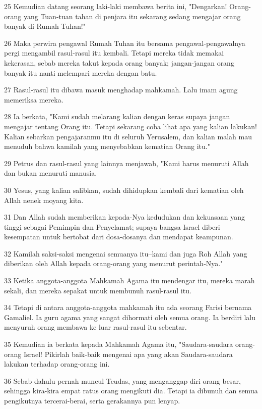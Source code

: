 \par 25 Kemudian datang seorang laki-laki membawa berita ini, "Dengarkan! Orang-orang yang Tuan-tuan tahan di penjara itu sekarang sedang mengajar orang banyak di Rumah Tuhan!"
\par 26 Maka perwira pengawal Rumah Tuhan itu bersama pengawal-pengawalnya pergi mengambil rasul-rasul itu kembali. Tetapi mereka tidak memakai kekerasan, sebab mereka takut kepada orang banyak; jangan-jangan orang banyak itu nanti melempari mereka dengan batu.
\par 27 Rasul-rasul itu dibawa masuk menghadap mahkamah. Lalu imam agung memeriksa mereka.
\par 28 Ia berkata, "Kami sudah melarang kalian dengan keras supaya jangan mengajar tentang Orang itu. Tetapi sekarang coba lihat apa yang kalian lakukan! Kalian sebarkan pengajaranmu itu di seluruh Yerusalem, dan kalian malah mau menuduh bahwa kamilah yang menyebabkan kematian Orang itu."
\par 29 Petrus dan rasul-rasul yang lainnya menjawab, "Kami harus menuruti Allah dan bukan menuruti manusia.
\par 30 Yesus, yang kalian salibkan, sudah dihidupkan kembali dari kematian oleh Allah nenek moyang kita.
\par 31 Dan Allah sudah memberikan kepada-Nya kedudukan dan kekuasaan yang tinggi sebagai Pemimpin dan Penyelamat; supaya bangsa Israel diberi kesempatan untuk bertobat dari dosa-dosanya dan mendapat keampunan.
\par 32 Kamilah saksi-saksi mengenai semuanya itu--kami dan juga Roh Allah yang diberikan oleh Allah kepada orang-orang yang menurut perintah-Nya."
\par 33 Ketika anggota-anggota Mahkamah Agama itu mendengar itu, mereka marah sekali, dan mereka sepakat untuk membunuh rasul-rasul itu.
\par 34 Tetapi di antara anggota-anggota mahkamah itu ada seorang Farisi bernama Gamaliel. Ia guru agama yang sangat dihormati oleh semua orang. Ia berdiri lalu menyuruh orang membawa ke luar rasul-rasul itu sebentar.
\par 35 Kemudian ia berkata kepada Mahkamah Agama itu, "Saudara-saudara orang-orang Israel! Pikirlah baik-baik mengenai apa yang akan Saudara-saudara lakukan terhadap orang-orang ini.
\par 36 Sebab dahulu pernah muncul Teudas, yang menganggap diri orang besar, sehingga kira-kira empat ratus orang mengikuti dia. Tetapi ia dibunuh dan semua pengikutnya tercerai-berai, serta gerakannya pun lenyap.
